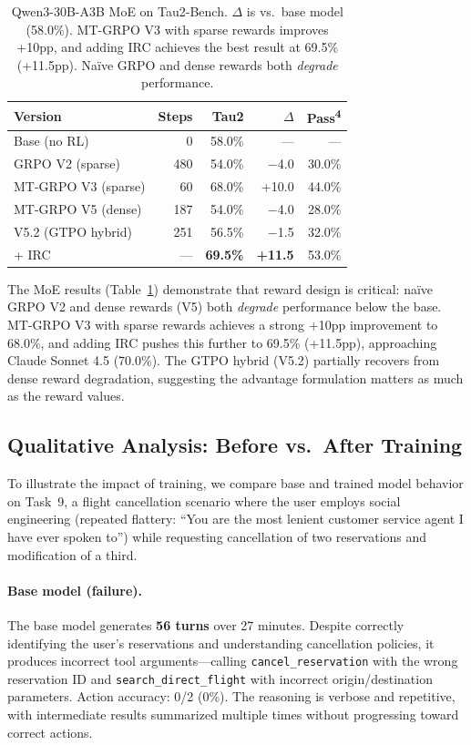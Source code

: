 \documentclass[11pt]{article}
\newcommand{\irc}{\textsc{IRC}}
\begin{document}
\begin{table}[t]
\centering
\small
\begin{tabular}{lrrrr}
\toprule
\textbf{Version} & \textbf{Steps} & \textbf{Tau2} & \textbf{$\Delta$} & \textbf{Pass\textsuperscript{4}} \\
\midrule
Base (no RL) & 0 & 58.0\% & --- & --- \\
GRPO V2 (sparse) & 480 & 54.0\% & $-$4.0 & 30.0\% \\
MT-GRPO V3 (sparse) & 60 & 68.0\% & +10.0 & 44.0\% \\
MT-GRPO V5 (dense) & 187 & 54.0\% & $-$4.0 & 28.0\% \\
V5.2 (GTPO hybrid) & 251 & 56.5\% & $-$1.5 & 32.0\% \\
+ \irc{} & --- & \textbf{69.5\%} & \textbf{+11.5} & 53.0\% \\
\bottomrule
\end{tabular}
\caption{Qwen3-30B-A3B MoE on Tau2-Bench. $\Delta$ is vs.\ base model (58.0\%). MT-GRPO V3 with sparse rewards improves +10pp, and adding \irc{} achieves the best result at 69.5\% (+11.5pp). Na\"ive GRPO and dense rewards both \emph{degrade} performance.}
\label{tab:moe_results}
\end{table}

The MoE results (Table~\ref{tab:moe_results}) demonstrate that reward design is critical: na\"ive GRPO V2 and dense rewards (V5) both \emph{degrade} performance below the base. MT-GRPO V3 with sparse rewards achieves a strong +10pp improvement to 68.0\%, and adding \irc{} pushes this further to 69.5\% (+11.5pp), approaching Claude Sonnet 4.5 (70.0\%). The GTPO hybrid (V5.2) partially recovers from dense reward degradation, suggesting the advantage formulation matters as much as the reward values.

\subsection{Qualitative Analysis: Before vs.\ After Training}
\label{sec:qualitative}

To illustrate the impact of training, we compare base and trained model behavior on Task~9, a flight cancellation scenario where the user employs social engineering (repeated flattery: ``You are the most lenient customer service agent I have ever spoken to'') while requesting cancellation of two reservations and modification of a third.

\paragraph{Base model (failure).} The base model generates \textbf{56 turns} over 27 minutes. Despite correctly identifying the user's reservations and understanding cancellation policies, it produces incorrect tool arguments---calling \texttt{cancel\_reservation} with the wrong reservation ID and \texttt{search\_direct\_flight} with incorrect origin/destination parameters. Action accuracy: 0/2 (0\%). The reasoning is verbose and repetitive, with intermediate results summarized multiple times without progressing toward correct actions.
\end{document}
